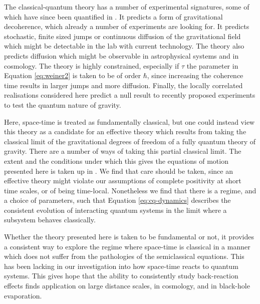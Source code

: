 \documentclass[aps,pra,showpacs,citeautoscript,amsmath,amssymb,floatfix,superscriptaddress,bbm, verbatim,amsfonts,changes,10pt,nofootinbib,longbibliography]{revtex4-1}
\newcommand{\foothide}[1]{\ignorespaces} %
\begin{document}
The classical-quantum theory has a number of experimental signatures, some of which have since been quantified in  \cite{oppenheim2021gravitationally}. It predicts a form of gravitational decoherence, which already a number of experiments are looking for\cite{bassi2013models,schmole2016micromechanical,carney2018massive}. %
It predicts stochastic, finite sized jumps\foothide{Here, space-time, as well as $g_{ab},\pi^{ab}$ are taken to be continuous, while the jumps in phase space are not. It's possible to imagine a theory in which the metric is discrete or even space-time itself, however, 
	there is no need to go this far in the present context.} or continuous diffusion of the gravitational field which might be detectable in the lab with current technology. 
The theory also predicts diffusion which might be observable in astrophysical systems and in cosmology. The theory is highly constrained, especially if $\tau$ the parameter in Equation \eqref{eq:weiner2} is taken to be of order $\hbar$, since increasing the coherence time results in larger jumps and more diffusion. 
Finally, the locally correlated realisations considered here predict a null result to recently proposed experiments to test the quantum nature of gravity\cite{kafri2013noise,bose2017spin,marletto2017gravitationally,entanglement_foot}. 

Here, space-time is treated as fundamentally classical, but one could instead  view this theory as  a candidate for an effective theory which results from taking the classical limit of the gravitational degrees of freedom of a fully quantum theory of gravity. 	There are a number of ways of taking this partial classical limit. The extent and the conditions under which this gives the equations of motion presented here is taken up in \cite{UCLQQtoCQ}. We find that care should be taken, since an effective theory might violate our assumptions of complete positivity at short time scales, or of being time-local. Nonetheless we find that there is a regime, and a choice of parameters, such that Equation \eqref{eq:cq-dynamics} describes the consistent evolution of interacting quantum systems in the limit where a subsystem behaves classically.

 Whether the theory presented here is taken to be fundamental or not, it provides a consistent way to explore the regime where space-time is classical in a manner which does not suffer from the pathologies of the semiclassical equations.  This has been lacking in our investigation into how space-time reacts to quantum systems.  This gives hope that the ability to consistently study back-reaction effects finds application on large distance scales, in cosmology, and in black-hole evaporation. 
 
\end{document}
